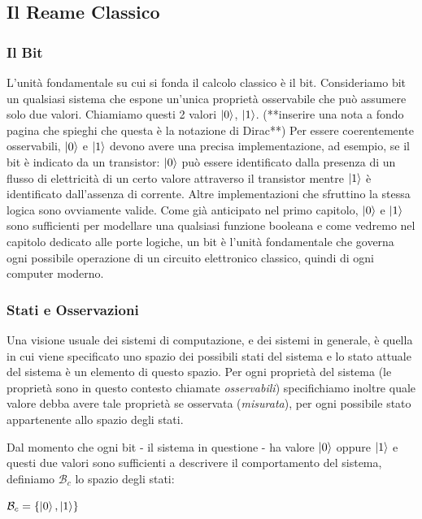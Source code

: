 \documentclass[12pt,a4paper,openright]{report}
\begin{document}
\subsection{Il Reame Classico}

\subsubsection{Il Bit}
L'unità fondamentale su cui si fonda il calcolo classico è il bit. Consideriamo bit un qualsiasi sistema che 
espone un'unica proprietà osservabile che può assumere solo due valori. Chiamiamo questi 2 valori $\ket0$, $\ket1$. (**inserire una nota a fondo pagina che spieghi che questa è la notazione di Dirac**)
Per essere coerentemente osservabili, $\ket0$ e $\ket1$ devono avere una precisa implementazione, ad esempio, se il bit è indicato
da un transistor: $\ket0$ può essere identificato dalla presenza di un flusso di elettricità di un certo valore attraverso il transistor mentre
$\ket1$ è identificato dall'assenza di corrente. Altre implementazioni che sfruttino la stessa logica sono ovviamente valide. 
Come già anticipato nel primo capitolo, $\ket0$ e $\ket1$ sono sufficienti per modellare una qualsiasi
funzione booleana e come vedremo nel capitolo dedicato alle porte logiche, un bit è l'unità fondamentale che governa ogni possibile
operazione di un circuito elettronico classico, quindi di ogni computer moderno.

\subsubsection{Stati e Osservazioni}

Una visione usuale dei sistemi di computazione, e dei sistemi in generale, è quella in cui viene specificato uno spazio dei possibili
stati del sistema e lo stato attuale del sistema è un elemento di questo spazio. Per ogni proprietà del sistema (le proprietà sono in questo contesto chiamate \emph{osservabili})
specifichiamo inoltre quale valore debba avere tale proprietà se osservata (\emph{misurata}), per ogni possibile stato appartenente allo spazio degli stati. \par

Dal momento che ogni bit - il sistema in questione - ha valore $\ket0$ oppure $\ket1$ e questi due valori sono sufficienti a descrivere 
il comportamento del sistema, definiamo $\mathcal{B}_c$ lo spazio degli stati:
\begin{center}
    $ \mathcal{B}_c = \{\ket0, \ket1 \}$
\end{center}
\end{document}
